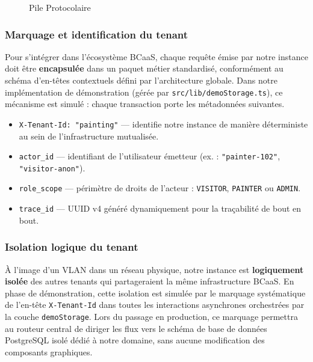 \documentclass[12pt,a4paper]{report}
\newcommand{\missingimage}[2]{%
  \fbox{\parbox{0.85\textwidth}{\centering \textbf{Image manquante :} #1}}%
  \caption{#2}%
}
\begin{document}
\begin{figure}[H]
    \centering
    \missingimage{BCaaS.png}{Pile Protocolaire}
    \label{fig:bcas_layers}
\end{figure}

\subsubsection{Marquage et identification du tenant}

Pour s'intégrer dans l'écosystème BCaaS, chaque requête émise par notre instance doit être \textbf{encapsulée} dans un paquet métier standardisé, conformément au schéma d'en-têtes contextuels défini par l'architecture globale. Dans notre implémentation de démonstration (gérée par \texttt{src/lib/demoStorage.ts}), ce mécanisme est simulé : chaque transaction porte les métadonnées suivantes.

\begin{itemize}
    \item \texttt{X-Tenant-Id: "painting"} --- identifie notre instance de manière déterministe au sein de l'infrastructure mutualisée.
    \item \texttt{actor\_id} --- identifiant de l'utilisateur émetteur (ex. : \texttt{"painter-102"}, \texttt{"visitor-anon"}).
    \item \texttt{role\_scope} --- périmètre de droits de l'acteur : \texttt{VISITOR}, \texttt{PAINTER} ou \texttt{ADMIN}.
    \item \texttt{trace\_id} --- UUID v4 généré dynamiquement pour la traçabilité de bout en bout.
\end{itemize}

\subsubsection{Isolation logique du tenant}

À l'image d'un VLAN dans un réseau physique, notre instance est \textbf{logiquement isolée} des autres tenants qui partageraient la même infrastructure BCaaS. En phase de démonstration, cette isolation est simulée par le marquage systématique de l'en-tête \texttt{X-Tenant-Id} dans toutes les interactions asynchrones orchestrées par la couche \texttt{demoStorage}. Lors du passage en production, ce marquage permettra au routeur central de diriger les flux vers le schéma de base de données PostgreSQL isolé dédié à notre domaine, sans aucune modification des composants graphiques.
\end{document}
